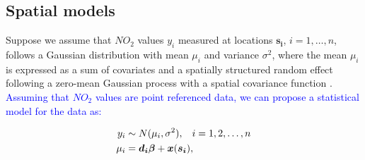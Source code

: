 \documentclass{article}
\begin{document}


 






\subsection{Spatial models}

Suppose we assume that $NO_2$ values $y_i$ measured at locations $\boldsymbol{s_i}$, $i=1,\ldots,n$, follows a Gaussian distribution with mean $\mu_i$ and variance $\sigma^2$, where the mean $\mu_i$ is expressed as a sum of covariates and a spatially structured random effect following a zero-mean Gaussian process with a spatial covariance function \citep{moraga2019}. \textcolor{blue}{Assuming that $NO_2$ values are point referenced data, we can propose a statistical model for the data as:}

\begin{align}
y_i & \sim N(\mu_i, \sigma^2), \hspace{3mm} i = 1, 2, \ldots, n \label{eqn:eq1}\\
\mu_i & = \boldsymbol{d_i \beta} + \boldsymbol{x}(\boldsymbol{s_i}), \label{eqn:eq2}
\end{align}
\end{document}
